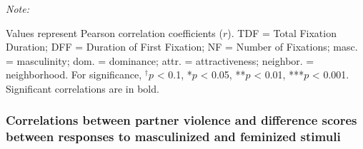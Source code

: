 \documentclass[
  bookmarksnumbered]{article}
\begin{document}
\begin{landscape}
\begin{table}[H]
\begin{threeparttable}
\begin{tabular}[t]
\bottomrule
\end{tabular}
\begin{tablenotes}[para]
\item \textit{Note: } 
\item Values represent Pearson correlation coefficients ($r$). TDF = Total Fixation Duration; DFF = Duration of First Fixation;
                            NF = Number of Fixations; masc. = masculinity;
                            dom. = dominance; attr. = attractiveness;  
                            neighbor. = neighborhood. For significance, $^{\dagger}p$ < 0.1, *$p$ < 0.05, **$p$ < 0.01, ***$p$ < 0.001. Significant correlations are in bold.
\end{tablenotes}
\end{threeparttable}
\end{table}
\end{landscape}

\subsubsection{Correlations between partner violence and difference scores between responses to masculinized and feminized stimuli}\label{correlations-between-partner-violence-and-difference-scores-between-responses-to-masculinized-and-feminized-stimuli}
\end{document}
